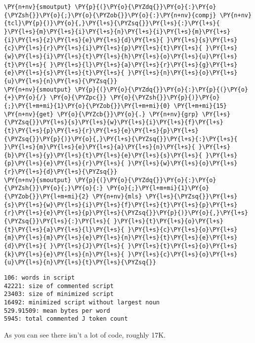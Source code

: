 \begin{tcolorbox}[breakable, size=fbox, boxrule=1pt, pad at break*=1mm,colback=cellbackground, colframe=cellborder]
\begin{Verbatim}[commandchars=\\\{\}]
\PY{n+nv}{smoutput} \PY{p}{(}\PY{o}{\PYZdq{}}\PY{o}{:}\PY{o}{\PYZsh{}}\PY{o}{;}\PY{o}{\PYZob{}}\PY{o}{:}\PY{n+nv}{compj} \PY{n+nv}{tcl}\PY{p}{)}\PY{o}{,}\PY{l+s}{\PYZsq{}}\PY{l+s}{:}\PY{l+s}{ }\PY{l+s}{m}\PY{l+s}{i}\PY{l+s}{n}\PY{l+s}{i}\PY{l+s}{m}\PY{l+s}{i}\PY{l+s}{z}\PY{l+s}{e}\PY{l+s}{d}\PY{l+s}{ }\PY{l+s}{s}\PY{l+s}{c}\PY{l+s}{r}\PY{l+s}{i}\PY{l+s}{p}\PY{l+s}{t}\PY{l+s}{ }\PY{l+s}{w}\PY{l+s}{i}\PY{l+s}{t}\PY{l+s}{h}\PY{l+s}{o}\PY{l+s}{u}\PY{l+s}{t}\PY{l+s}{ }\PY{l+s}{l}\PY{l+s}{a}\PY{l+s}{r}\PY{l+s}{g}\PY{l+s}{e}\PY{l+s}{s}\PY{l+s}{t}\PY{l+s}{ }\PY{l+s}{n}\PY{l+s}{o}\PY{l+s}{u}\PY{l+s}{n}\PY{l+s}{\PYZsq{}}
\PY{n+nv}{smoutput} \PY{p}{(}\PY{o}{\PYZdq{}}\PY{o}{:}\PY{p}{(}\PY{o}{+}\PY{o}{/} \PY{o}{\PYZpc{}} \PY{o}{\PYZsh{}}\PY{p}{)}\PY{o}{;}\PY{l+m+mi}{1}\PY{o}{\PYZob{}}\PY{l+m+mi}{0} \PY{l+m+mi}{15} \PY{n+nv}{get} \PY{o}{\PYZcb{}}\PY{o}{.} \PY{n+nv}{grp} \PY{l+s}{\PYZsq{}}\PY{l+s}{s}\PY{l+s}{w}\PY{l+s}{i}\PY{l+s}{f}\PY{l+s}{t}\PY{l+s}{p}\PY{l+s}{r}\PY{l+s}{e}\PY{l+s}{p}\PY{l+s}{\PYZsq{}}\PY{p}{)}\PY{o}{,}\PY{l+s}{\PYZsq{}}\PY{l+s}{:}\PY{l+s}{ }\PY{l+s}{m}\PY{l+s}{e}\PY{l+s}{a}\PY{l+s}{n}\PY{l+s}{ }\PY{l+s}{b}\PY{l+s}{y}\PY{l+s}{t}\PY{l+s}{e}\PY{l+s}{s}\PY{l+s}{ }\PY{l+s}{p}\PY{l+s}{e}\PY{l+s}{r}\PY{l+s}{ }\PY{l+s}{w}\PY{l+s}{o}\PY{l+s}{r}\PY{l+s}{d}\PY{l+s}{\PYZsq{}}
\PY{n+nv}{smoutput} \PY{p}{(}\PY{o}{\PYZdq{}}\PY{o}{:}\PY{o}{\PYZsh{}}\PY{o}{;}\PY{o}{:} \PY{o}{;}\PY{l+m+mi}{1}\PY{o}{\PYZob{}}\PY{l+m+mi}{2} \PY{n+nv}{mls} \PY{l+s}{\PYZsq{}}\PY{l+s}{s}\PY{l+s}{w}\PY{l+s}{i}\PY{l+s}{f}\PY{l+s}{t}\PY{l+s}{p}\PY{l+s}{r}\PY{l+s}{e}\PY{l+s}{p}\PY{l+s}{\PYZsq{}}\PY{p}{)}\PY{o}{,}\PY{l+s}{\PYZsq{}}\PY{l+s}{:}\PY{l+s}{ }\PY{l+s}{t}\PY{l+s}{o}\PY{l+s}{t}\PY{l+s}{a}\PY{l+s}{l}\PY{l+s}{ }\PY{l+s}{c}\PY{l+s}{o}\PY{l+s}{m}\PY{l+s}{m}\PY{l+s}{e}\PY{l+s}{n}\PY{l+s}{t}\PY{l+s}{e}\PY{l+s}{d}\PY{l+s}{ }\PY{l+s}{J}\PY{l+s}{ }\PY{l+s}{t}\PY{l+s}{o}\PY{l+s}{k}\PY{l+s}{e}\PY{l+s}{n}\PY{l+s}{ }\PY{l+s}{c}\PY{l+s}{o}\PY{l+s}{u}\PY{l+s}{n}\PY{l+s}{t}\PY{l+s}{\PYZsq{}}
\end{Verbatim}
\end{tcolorbox}

    \begin{Verbatim}[commandchars=\\\{\}]
106: words in script
42221: size of commented script
23403: size of minimized script
16492: minimized script without largest noun
529.91509: mean bytes per word
5945: total commented J token count
    \end{Verbatim}

    As you can see there isn't a lot of code, roughly 17K.

